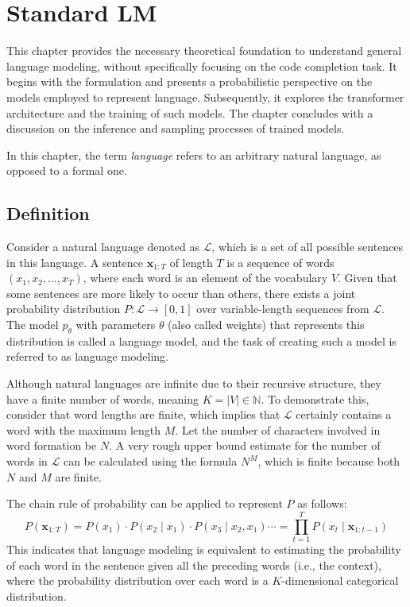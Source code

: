 \chapter{Standard LM}\label{chap:standard-lm}

This chapter provides the necessary theoretical foundation to understand general language modeling, without specifically focusing on the code completion task. It begins with the formulation and presents a probabilistic perspective on the models employed to represent language. Subsequently, it explores the transformer architecture and the training of such models. The chapter concludes with a discussion on the inference and sampling processes of trained models.

In this chapter, the term \textit{language} refers to an arbitrary natural language, as opposed to a formal one.

\section{Definition}

Consider a natural language denoted as \(\mathcal{L}\), which is a set of all possible sentences in this language. A sentence \(\bm{x}_{1:T}\) of length \(T\) is a sequence of words \((x_1, x_2, \ldots, x_T)\), where each word is an element of the vocabulary \(V\). Given that some sentences are more likely to occur than others, there exists a joint probability distribution \(P : \mathcal{L} \to [0, 1]\) over variable-length sequences from \(\mathcal{L}\). The model \(p_\theta\) with parameters \(\theta\) (also called weights) that represents this distribution is called a language model, and the task of creating such a model is referred to as language modeling.

Although natural languages are infinite due to their recursive structure, they have a finite number of words, meaning \(K = |V| \in \mathbb{N}\). To demonstrate this, consider that word lengths are finite, which implies that \(\mathcal{L}\) certainly contains a word with the maximum length \(M\). Let the number of characters involved in word formation be \(N\). A very rough upper bound estimate for the number of words in \(\mathcal{L}\) can be calculated using the formula \(N^M\), which is finite because both \(N\) and \(M\) are finite.

The chain rule of probability can be applied to represent \(P\) as follows:
\begin{equation}\label{eq:probability-chain-rule}
    P(\bm{x}_{1:T}) = P(x_1) \cdot P(x_2 \mid x_1) \cdot P(x_3 \mid x_2, x_1) \cdots = \prod_{t=1}^{T}P(x_t \mid \bm{x}_{1:t-1})
\end{equation} 
This indicates that language modeling is equivalent to estimating the probability of each word in the sentence given all the preceding words (i.e., the context), where the probability distribution over each word is a \(K\)-dimensional categorical distribution.


